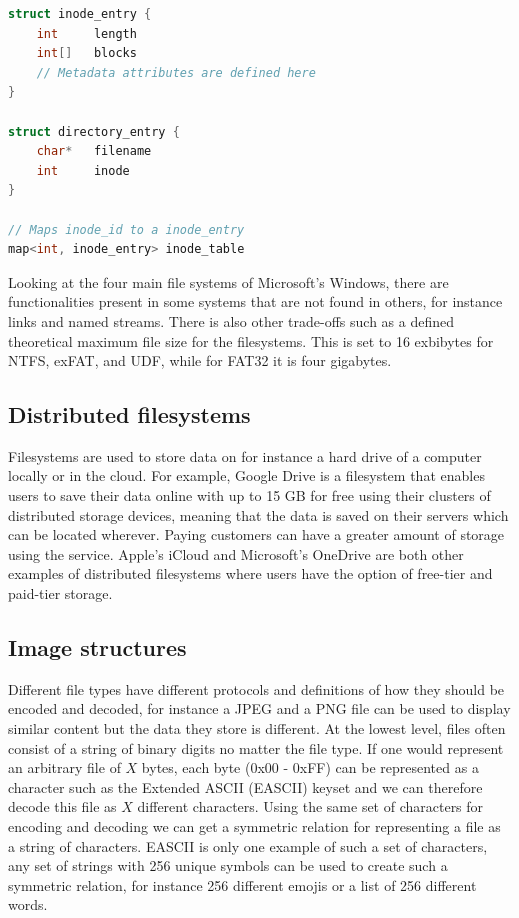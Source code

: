 \begin{minipage}{\linewidth}
\begin{lstlisting}[language=c, caption={Pseudocode of a minimalistic inode filesystem structure}, label=lst:inode_fs]
struct inode_entry {
	int 	length
	int[]	blocks
	// Metadata attributes are defined here
}

struct directory_entry {
	char*   filename
	int     inode
}

// Maps inode_id to a inode_entry
map<int, inode_entry> inode_table

\end{lstlisting}
\end{minipage}

Looking at the four main file systems of Microsoft's Windows, there are functionalities present in some systems that are not found in others, for instance links and named streams. There is also other trade-offs such as a defined theoretical maximum file size\cite{mikbenFileSystemFunctionality} for the filesystems. This is set to 16 exbibytes for NTFS, exFAT, and UDF, while for FAT32 it is four gigabytes.

\subsection{Distributed filesystems}
Filesystems are used to store data on for instance a hard drive of a computer locally or in the cloud. For example, Google Drive is a filesystem that enables users to save their data online with up to 15 GB for free\cite{CloudStorageWork} using their clusters of distributed storage devices, meaning that the data is saved on their servers which can be located wherever\cite{DistributedStorageWhat}. Paying customers can have a greater amount of storage using the service. Apple's iCloud and Microsoft's OneDrive are both other examples of distributed filesystems where users have the option of free-tier and paid-tier storage.

\subsection{Image structures}
Different file types have different protocols and definitions of how they should be encoded and decoded, for instance a JPEG and a PNG file can be used to display similar content but the data they store is different. At the lowest level, files often consist of a string of binary digits no matter the file type. If one would represent an arbitrary file of $X$ bytes, each byte (0x00 - 0xFF) can be represented as a character such as the Extended ASCII (EASCII) keyset and we can therefore decode this file as $X$ different characters. Using the same set of characters for encoding and decoding we can get a symmetric relation for representing a file as a string of characters. EASCII is only one example of such a set of characters, any set of strings with 256 unique symbols can be used to create such a symmetric relation, for instance 256 different emojis or a list of 256 different words.

